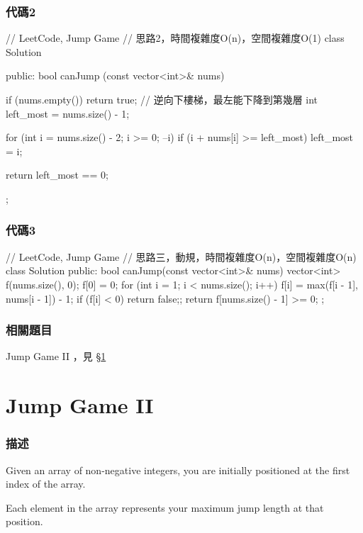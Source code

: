 \subsubsection{代碼2}
\begin{Code}
// LeetCode, Jump Game
// 思路2，時間複雜度O(n)，空間複雜度O(1)
class Solution {
public:
    bool canJump (const vector<int>& nums) {
        if (nums.empty()) return true;
        // 逆向下樓梯，最左能下降到第幾層
        int left_most = nums.size() - 1;

        for (int i = nums.size() - 2; i >= 0; --i)
            if (i + nums[i] >= left_most)
                left_most = i;

        return left_most == 0;
    }
};
\end{Code}


\subsubsection{代碼3}
\begin{Code}
// LeetCode, Jump Game
// 思路三，動規，時間複雜度O(n)，空間複雜度O(n)
class Solution {
public:
    bool canJump(const vector<int>& nums) {
        vector<int> f(nums.size(), 0);
        f[0] = 0;
        for (int i = 1; i < nums.size(); i++) {
            f[i] = max(f[i - 1], nums[i - 1]) - 1;
            if (f[i] < 0) return false;;
        }
        return f[nums.size() - 1] >= 0;
    }
};
\end{Code}


\subsubsection{相關題目}
\begindot
\item Jump Game II ，見 \S \ref{sec:jump-game-ii}
\myenddot


\section{Jump Game II} %
\label{sec:jump-game-ii}


\subsubsection{描述}
Given an array of non-negative integers, you are initially positioned at the first index of the array.

Each element in the array represents your maximum jump length at that position.

